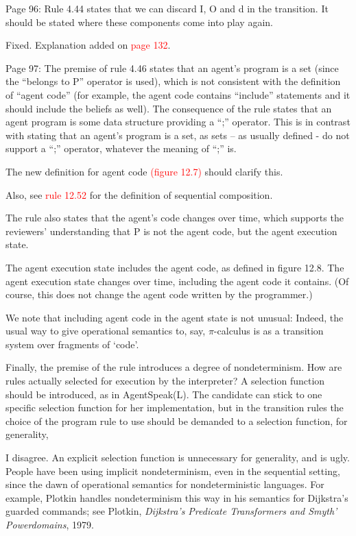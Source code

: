 \documentclass{article}
\newcommand*\R[1]{\textcolor{red}{#1}} %
\newenvironment{them}{\noindent\begingroup\color{blue}}{\endgroup\par}
\begin{document}
\begin{them}

Page 96:
Rule 4.44 states that we can discard I, O and d in the transition. It should be
stated where these components come into play again.

\end{them}
Fixed. Explanation added on \R{page 132}.

\begin{them}

Page 97:
The premise of rule 4.46 states that an agent's program is a set (since the
“belongs to P” operator is used), which is not consistent with the definition
of “agent code” (for example, the agent code contains “include” statements and
it should include the beliefs as well). The consequence of the rule states that
an agent program is some data structure providing a “;” operator. This is in
contrast with stating that an agent's program is a set, as sets – as usually
defined - do not support a “;” operator, whatever the meaning of “;” is.

\end{them}
The new definition for agent code \R{(figure 12.7)} should clarify this.

Also, see \R{rule 12.52} for the definition of sequential composition.


\begin{them}

The rule also states that the agent's code changes over time, which supports
the reviewers' understanding that P is not the agent code, but the agent
execution state.

\end{them}
The agent execution state includes the agent code, as defined in figure 12.8. The agent execution state changes over time,
  including the agent code it contains.
(Of course, this does not change the agent code written by the programmer.)

We note that including agent code in the agent state is not unusual:
  Indeed, the usual way to give operational semantics to, say,
    $\pi$-calculus is as a transition system over fragments of `code'.

\begin{them}

Finally, the premise of the rule introduces a degree of nondeterminism. How are
rules actually selected for execution by the interpreter? A selection function
should be introduced, as in AgentSpeak(L). The candidate can stick to one
specific selection function for her implementation, but in the transition rules
the choice of the program rule to use should be demanded to a selection
function, for generality,

\end{them}
I disagree.
An explicit selection function is unnecessary for generality, and is ugly.
People have been using implicit nondeterminism,
  even in the sequential setting,
  since the dawn of operational semantics for nondeterministic languages.
For example,
  Plotkin handles nondeterminism this way in his semantics for
  Dijkstra's guarded commands;
see Plotkin, {\it Dijkstra's Predicate Transformers and Smyth' Powerdomains},
  1979.
\end{document}
